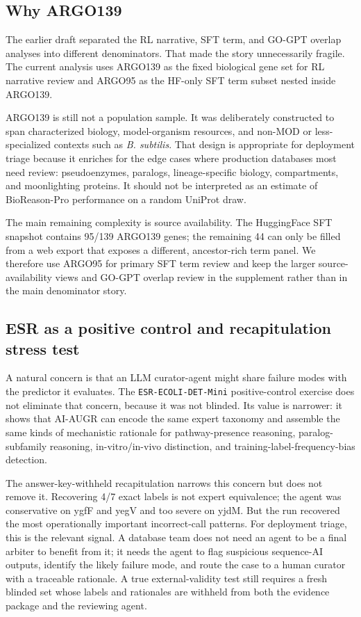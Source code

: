 \documentclass[
  11pt,
]{article}
\begin{document}
\hypertarget{why-argo139}{%
\subsection{Why ARGO139}\label{why-argo139}}

The earlier draft separated the RL narrative, SFT term, and GO-GPT
overlap analyses into different denominators. That made the story
unnecessarily fragile. The current analysis uses ARGO139 as the fixed
biological gene set for RL narrative review and ARGO95 as the HF-only
SFT term subset nested inside ARGO139.

ARGO139 is still not a population sample. It was deliberately
constructed to span characterized biology, model-organism resources, and
non-MOD or less-specialized contexts such as \emph{B. subtilis}. That
design is appropriate for deployment triage because it enriches for the
edge cases where production databases most need review: pseudoenzymes,
paralogs, lineage-specific biology, compartments, and moonlighting
proteins. It should not be interpreted as an estimate of BioReason-Pro
performance on a random UniProt draw.

The main remaining complexity is source availability. The HuggingFace
SFT snapshot contains 95/139 ARGO139 genes; the remaining 44 can only be
filled from a web export that exposes a different, ancestor-rich term
panel. We therefore use ARGO95 for primary SFT term review and keep the
larger source-availability views and GO-GPT overlap review in the
supplement rather than in the main denominator story.

\hypertarget{esr-as-a-positive-control-and-recapitulation-stress-test}{%
\subsection{ESR as a positive control and recapitulation stress
test}\label{esr-as-a-positive-control-and-recapitulation-stress-test}}

A natural concern is that an LLM curator-agent might share failure modes
with the predictor it evaluates. The \texttt{ESR-ECOLI-DET-Mini}
positive-control exercise does not eliminate that concern, because it
was not blinded. Its value is narrower: it shows that AI-AUGR can encode
the same expert taxonomy and assemble the same kinds of mechanistic
rationale for pathway-presence reasoning, paralog-subfamily reasoning,
in-vitro/in-vivo distinction, and training-label-frequency-bias
detection.

The answer-key-withheld recapitulation narrows this concern but does not
remove it. Recovering 4/7 exact labels is not expert equivalence; the
agent was conservative on ygfF and yegV and too severe on yjdM. But the
run recovered the most operationally important incorrect-call patterns.
For deployment triage, this is the relevant signal. A database team does
not need an agent to be a final arbiter to benefit from it; it needs the
agent to flag suspicious sequence-AI outputs, identify the likely
failure mode, and route the case to a human curator with a traceable
rationale. A true external-validity test still requires a fresh blinded
set whose labels and rationales are withheld from both the evidence
package and the reviewing agent.
\end{document}
